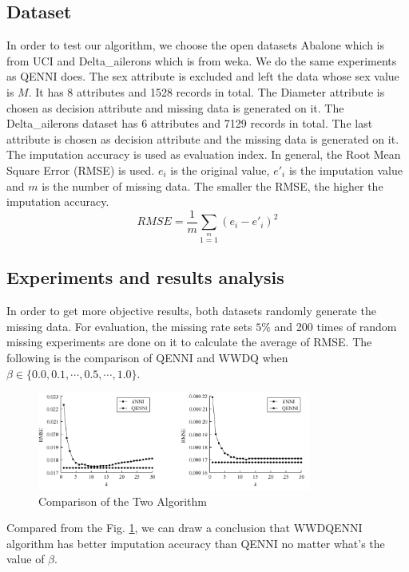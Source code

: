 \documentclass[print]{jicspack}
\begin{document}
\subsection{Dataset}
\label{sec:1.1}
In order to test our algorithm, we choose the open datasets Abalone which is from UCI and Delta\_ailerons which is from weka. We do the same experiments as QENNI does. The sex attribute is excluded and left the data whose sex value is $M$. It has 8 attributes and 1528 records in total. The Diameter attribute is chosen as decision attribute and missing data is generated on it. The Delta\_ailerons dataset has 6 attributes and 7129 records in total. The last attribute is chosen as decision attribute and the missing data is generated on it. The imputation accuracy is used as evaluation index. In general, the Root Mean Square Error (RMSE)\cite{RMSE} is used. $e_i$ is the original value, $e'_i$ is the imputation value and $m$ is the number of missing data. The smaller the RMSE, the higher the imputation accuracy.
\begin{equation}
\label{eq:6}
RMSE = \frac{1}{m}\sum\limits_{1=1}\limits^{m}(e_i - e'_i)^2
\end{equation}

\subsection{Experiments and results analysis}
In order to get more objective results, both datasets randomly generate the missing data. For evaluation, the missing rate sets $5\%$ and 200 times of random missing experiments are done on it to calculate the average of RMSE. The following is the comparison of QENNI and WWDQ when $\beta \in \{0.0, 0.1,\cdots,  0.5,\cdots, 1.0\}$.

\begin{figure}[h]
\centering
\includegraphics[angle=0, width=0.8\textwidth]{figure4.png}
\caption{Comparison of the Two Algorithm}
\label{fig:figure4}
\end{figure}
Compared from the Fig. \ref{fig:figure4}, we can draw a conclusion that WWDQENNI algorithm has better imputation accuracy than QENNI no matter what's the value of $\beta$.
\end{document}
